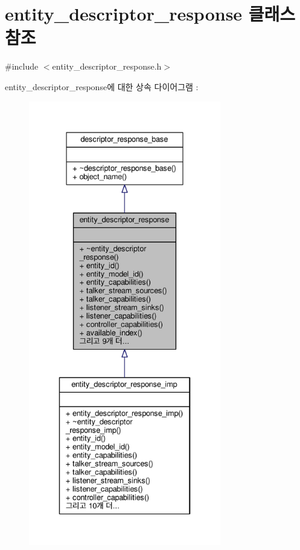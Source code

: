 \hypertarget{classavdecc__lib_1_1entity__descriptor__response}{}\section{entity\+\_\+descriptor\+\_\+response 클래스 참조}
\label{classavdecc__lib_1_1entity__descriptor__response}


{\ttfamily \#include $<$entity\+\_\+descriptor\+\_\+response.\+h$>$}



entity\+\_\+descriptor\+\_\+response에 대한 상속 다이어그램 \+: 
\nopagebreak
\begin{figure}[H]
\begin{center}
\leavevmode
\includegraphics[height=550pt]{classavdecc__lib_1_1entity__descriptor__response__inherit__graph}
\end{center}
\end{figure}


